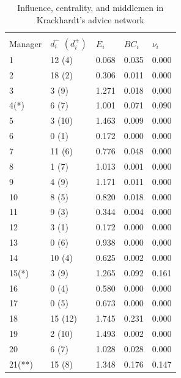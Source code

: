 \documentclass[11pt,fleqn]{article}
\begin{document}
\begin{table}[h]
\begin{center}
\begin{tabu} to \textwidth {X[l]  X[c]  X[c]  X[c]  X[c]}

\\[-1.8ex]\hline
\hline \\[-1.8ex]
Manager       & $d^-_i$ $\left(d^+_i\right)$& $E_i$    & $BC_i$   & $\nu_i$      \\              & 12 (4)           & 0.068    & 0.035    & 0.000 \\
2             & 18 (2)           & 0.306    & 0.011    & 0.000 \\
3             & 3 (9)            & 1.271    & 0.018    & 0.000 \\
4(*)          & 6 (7)            & 1.001    & 0.071    & 0.090 \\
5             & 3 (10)           & 1.463    & 0.009    & 0.000 \\
6             & 0 (1)            & 0.172    & 0.000    & 0.000 \\
7             & 11 (6)           & 0.776    & 0.048    & 0.000 \\
8             & 1 (7)            & 1.013    & 0.001    & 0.000 \\
9             & 4 (9)            & 1.171    & 0.011    & 0.000 \\
10            & 8 (5)            & 0.820    & 0.018    & 0.000 \\
11            & 9 (3)            & 0.344    & 0.004    & 0.000 \\
12            & 3 (1)            & 0.172    & 0.000    & 0.000 \\
13            & 0 (6)            & 0.938    & 0.000    & 0.000 \\
14            & 10 (4)           & 0.625    & 0.002    & 0.000 \\
15(*)         & 3 (9)            & 1.265    & 0.092    & 0.161 \\
16            & 0 (4)            & 0.580    & 0.000    & 0.000 \\
17            & 0 (5)            & 0.673    & 0.000    & 0.000 \\
18            & 15 (12)          & 1.745    & 0.231    & 0.000 \\
19            & 2 (10)           & 1.493    & 0.002    & 0.000 \\
20            & 6 (7)            & 1.028    & 0.028    & 0.000 \\
21(**)        & 15 (8)           & 1.348    & 0.176    & 0.147 \\ \hline
\end{tabu}
\caption{Influence, centrality, and middlemen in Krackhardt's advice network}
\label{tabkrackhardt}
\end{center}
\end{table}
\end{document}
